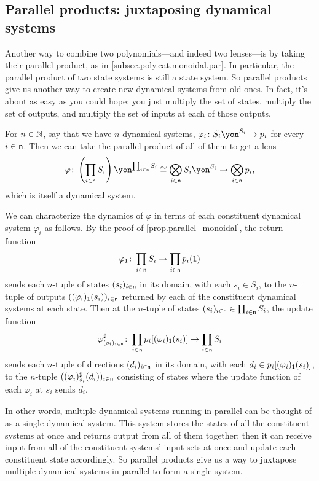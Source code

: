 \documentclass[Book-Poly]{subfiles}
\begin{document}
\subsection{Parallel products: juxtaposing dynamical systems}\label{subsec.poly.dyn_sys.new.par}

Another way to combine two polynomials---and indeed two lenses---is by taking their parallel product, as in \cref{subsec.poly.cat.monoidal.par}.
In particular, the parallel product of two state systems is still a state system.
So parallel products give us another way to create new dynamical systems from old ones.
In fact, it's about as easy as you could hope: you just multiply the set of states, multiply the set of outputs, and multiply the set of inputs at each of those outputs.

For $n\in\mathbb{N}$, say that we have $n$ dynamical systems, $\varphi_i\colon S_i\yon^{S_i}\to p_i$ for every $i\in\mathsf{n}$.
Then we can take the parallel product of all of them to get a lens \[\varphi\colon \left(\prod_{i\in\ord{n}}S_i\right)\yon^{\prod_{i\in\ord{n}}S_i}\iso\bigotimes_{i\in\ord{n}}S_i\yon^{S_i}\to\bigotimes_{i\in\ord{n}}p_i,\] which is itself a dynamical system.

We can characterize the dynamics of $\varphi$ in terms of each constituent dynamical system $\varphi_i$ as follows.
By the proof of \cref{prop.parallel_monoidal}, the return function \[\varphi_{\textsf{1}}\colon \prod_{i\in\mathsf{n}}S_i\to\prod_{i\in\mathsf{n}}p_i(\textsf{1})\] sends each $n$-tuple of states $(s_i)_{i\in\mathsf{n}}$ in its domain, with each $s_i\in S_i$, to the $n$-tuple of outputs $((\varphi_i)_{\textsf{1}}(s_i))_{i\in\mathsf{n}}$ returned by each of the constituent dynamical systems at each state.
Then at the $n$-tuple of states $(s_i)_{i\in\mathsf{n}}\in\prod_{i\in\mathsf{n}}S_i$, the update function \[\varphi^\sharp_{(s_i)_{i\in\mathsf{n}}}\colon\prod_{i\in\mathsf{n}}p_i[(\varphi_i)_{\textsf{1}}(s_i)]\to\prod_{i\in\mathsf{n}}S_i\] sends each $n$-tuple of directions $(d_i)_{i\in\mathsf{n}}$ in its domain, with each $d_i\in p_i[(\varphi_i)_{\textsf{1}}(s_i)]$, to the $n$-tuple $((\varphi_i)^\sharp_{s_i}(d_i))_{i\in\mathsf{n}}$ consisting of states where the update function of each $\varphi_i$ at $s_i$ sends $d_i$.

In other words, multiple dynamical systems running in parallel can be thought of as a single dynamical system.
This system stores the states of all the constituent systems at once and returns output from all of them together; then it can receive input from all of the constituent systems' input sets at once and update each constituent state accordingly.
So parallel products give us a way to juxtapose multiple dynamical systems in parallel to form a single system.
\end{document}
